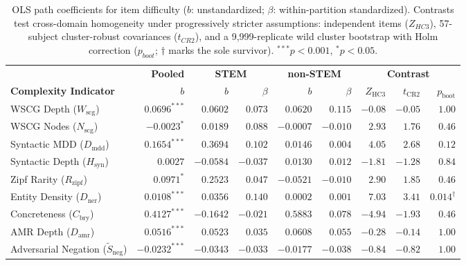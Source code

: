 \begin{table}[t]
\centering\scriptsize
\setlength{\tabcolsep}{3.5pt}
\begin{tabular}{lrrrrrrrr}
\toprule
& \textbf{Pooled} & \multicolumn{2}{c}{\textbf{STEM}} & \multicolumn{2}{c}{\textbf{non-STEM}} & \multicolumn{3}{c}{\textbf{Contrast}} \\
\cmidrule(lr){2-2}\cmidrule(lr){3-4}\cmidrule(lr){5-6}\cmidrule(lr){7-9}
\textbf{Complexity Indicator} & \textbf{$b$} & \textbf{$b$} & \textbf{$\beta$} & \textbf{$b$} & \textbf{$\beta$} & \textbf{$Z_{\text{HC3}}$} & \textbf{$t_{\text{CR2}}$} & \textbf{$p_{\text{boot}}$} \\
\midrule
WSCG Depth ($W_\mathrm{scg}$)                      & $0.0696^{***}$  & $0.0602$  & $0.073$  & $0.0620$  & $0.115$  & $-0.08$ & $-0.05$ & $1.00$ \\
WSCG Nodes ($N_\mathrm{scg}$)                      & $-0.0023^{*}$   & $0.0189$  & $0.088$  & $-0.0007$ & $-0.010$ & $2.93$  & $1.76$  & $0.46$ \\
Syntactic MDD ($D_\mathrm{mdd}$)                   & $0.1654^{***}$  & $0.3694$  & $0.102$  & $0.0146$  & $0.004$  & $4.05$  & $2.68$  & $0.12$ \\
Syntactic Depth ($H_\mathrm{syn}$)                 & $0.0027$        & $-0.0584$ & $-0.037$ & $0.0130$  & $0.012$  & $-1.81$ & $-1.28$ & $0.84$ \\
Zipf Rarity ($R_\mathrm{zipf}$)                    & $0.0971^{*}$    & $0.2523$  & $0.047$  & $-0.0521$ & $-0.010$ & $2.90$  & $1.85$  & $0.46$ \\
Entity Density ($D_\mathrm{ner}$)                  & $0.0108^{***}$  & $0.0356$  & $0.140$  & $0.0002$  & $0.001$  & $7.03$  & $3.41$  & $\mathbf{0.014}^{\dagger}$ \\
Concreteness ($C_\mathrm{bry}$)                    & $0.4127^{***}$  & $-0.1642$ & $-0.021$ & $0.5883$  & $0.078$  & $-4.94$ & $-1.93$ & $0.46$ \\
AMR Depth ($D_\mathrm{amr}$)                       & $0.0516^{***}$  & $0.0523$  & $0.035$  & $0.0608$  & $0.055$  & $-0.28$ & $-0.14$ & $1.00$ \\
Adversarial Negation ($\widetilde{S}_\mathrm{neg}$)& $-0.0232^{***}$ & $-0.0343$ & $-0.033$ & $-0.0177$ & $-0.038$ & $-0.84$ & $-0.82$ & $1.00$ \\
\bottomrule
\end{tabular}
\caption{OLS path coefficients for item difficulty ($b$: unstandardized; $\beta$: within-partition standardized). Contrasts test cross-domain homogeneity under progressively stricter assumptions: independent items ($Z_{HC3}$), 57-subject cluster-robust covariances ($t_{CR2}$), and a 9,999-replicate wild cluster bootstrap with Holm correction ($p_{boot}$; $\dagger$ marks the sole survivor). $^{***}p<0.001$, $^{*}p<0.05$.}
\label{tab:stratified}
\end{table}

